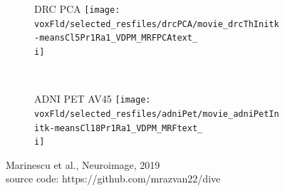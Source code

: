\begin{frame}
\begin{figure}[h]
\begin{animateinline}{\speed}
{{  \begin{subfigure}[b]{0.25 \textwidth}
   \centering
   \Large{DRC PCA}
    \texttt{[image: \\voxFld/selected\_resfiles/drcPCA/movie\_drcThInitk-meansCl5Pr1Ra1\_VDPM\_MRFPCAtext\_\\i]} 
  \end{subfigure}
  ~
  \begin{subfigure}[b]{0.25 \textwidth}
   \centering
   \Large{ADNI PET AV45}
   \texttt{[image: \\voxFld/selected\_resfiles/adniPet/movie\_adniPetInitk-meansCl18Pr1Ra1\_VDPM\_MRFtext\_\\i]} 
  \end{subfigure}
  
  }  
  }
  \end{animateinline}

  
  \small{Marinescu et al., Neuroimage, 2019}\\
  \small{source code: https://github.com/mrazvan22/dive}

\end{figure}


\end{frame}





\newcommand{\outFoldADNICVbrains}{../overview/figures_ipmi_paper/crossvalid/adniThavgFWHM0Initk-meansCl3Pr0Ra1_VWDPMMean}
\newcommand{\scaleFig}{0.16}

